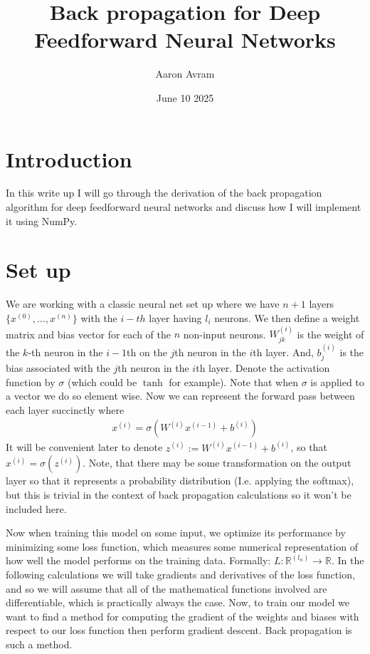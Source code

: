 \documentclass[12pt]{article}
\title{Back propagation for Deep Feedforward Neural Networks}
\author{Aaron Avram}
\date{June 10 2025}
\begin{document}
\maketitle

\section*{Introduction}
In this write up I will go through the derivation of the back propagation algorithm
for deep feedforward neural networks and discuss how I will implement it using
NumPy.

\section*{Set up}
We are working with a classic neural net set up where we have $n + 1$ layers
$\{x^{(0)}, \ldots, x^{(n)}\}$ with the $i-th$ layer having $l_i$ neurons. We then define a weight matrix and bias vector for each of the $n$ non-input neurons.
$W^{(i)}_{jk}$ is the weight of the $k$-th neuron in the $i-1$th on the $j$th neuron
in the $i$th layer. And, $b^{(i)}_j$ is the bias associated with the $j$th neuron in the 
$i$th layer. Denote the activation function by $\sigma$ (which could be $\tanh$ for example). Note that when
$\sigma$ is applied to a vector we do so element wise. Now we can represent the forward pass between each layer succinctly where
\begin{align*}
    x^{(i)} = \sigma(W^{(i)}x^{(i-1)} + b^{(i)})
\end{align*}
It will be convenient later to denote $z^{(i)} := W^{(i)}x^{(i-1)} + b^{(i)}$, so
that $x^{(i)} = \sigma(z^{(i)})$. Note, that there may be some transformation
on the output layer so that it represents a probability distribution (I.e. applying the softmax),
but this is trivial in the context of back propagation calculations so it won't be included here.


Now when training this model on some input, we optimize its performance
by minimizing some loss function, which measures some numerical representation
of how well the model performs on the training data. Formally: $L: \mathbb{R}^{(l_n)} \to \mathbb{R}$. In the
following calculations we will take gradients and derivatives of the loss function, and so we will assume
that all of the mathematical functions involved are differentiable, which is practically always the case. Now,
to train our model we want to find a method for computing the gradient of the weights and biases with respect to our loss function
then perform gradient descent. Back propagation is such a method.
\end{document}
